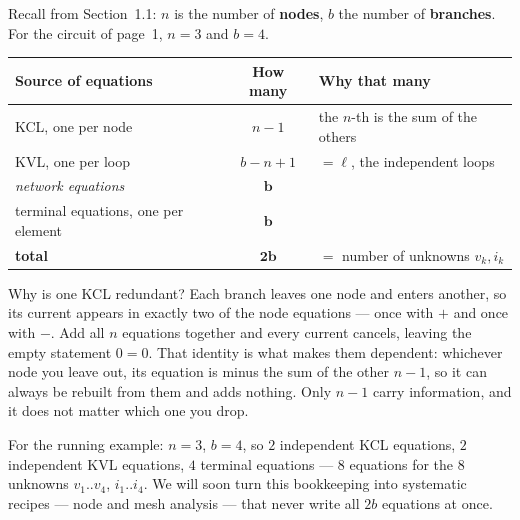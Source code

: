 \documentclass[11pt,a4paper]{article}
\begin{document}
Recall from Section~1.1: $n$ is the number of \textbf{nodes}, $b$ the number of
\textbf{branches}. For the circuit of page~1, $n = 3$ and $b = 4$.

\begin{center}
\small
\begin{tabular}{@{}l c l@{}}
\toprule
\textbf{Source of equations} & \textbf{How many} & \textbf{Why that many}\\
\midrule
KCL, one per node          & $n - 1$      & the $n$-th is the sum of the others\\
KVL, one per loop          & $b - n + 1$  & $=\ell$, the independent loops\\[2pt]
\quad \textit{network equations} & $\mathbf{b}$ & \\
\midrule
terminal equations, one per element & $\mathbf{b}$ & \\
\midrule
\textbf{total} & $\mathbf{2b}$ & $=$ number of unknowns $v_k, i_k$\\
\bottomrule
\end{tabular}
\end{center}

Why is one KCL redundant? Each branch leaves one node and enters another, so its current
appears in exactly two of the node equations --- once with $+$ and once with $-$. Add all
$n$ equations together and every current cancels, leaving the empty statement $0 = 0$.
That identity is what makes them dependent: whichever node you leave out, its equation is
minus the sum of the other $n-1$, so it can always be rebuilt from them and adds nothing.
Only $n-1$ carry information, and it does not matter which one you drop.

For the running example: $n = 3$, $b = 4$, so $2$ independent KCL equations, $2$
independent KVL equations, $4$ terminal equations --- $8$ equations for the $8$ unknowns
$v_1..v_4$, $i_1..i_4$. We will soon turn this bookkeeping into systematic recipes --- node
and mesh analysis --- that never write all $2b$ equations at once.
\end{document}
